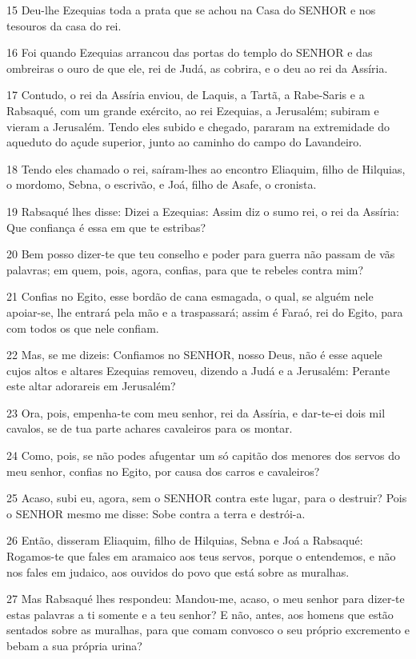 \par 15 Deu-lhe Ezequias toda a prata que se achou na Casa do SENHOR e nos tesouros da casa do rei.
\par 16 Foi quando Ezequias arrancou das portas do templo do SENHOR e das ombreiras o ouro de que ele, rei de Judá, as cobrira, e o deu ao rei da Assíria.
\par 17 Contudo, o rei da Assíria enviou, de Laquis, a Tartã, a Rabe-Saris e a Rabsaqué, com um grande exército, ao rei Ezequias, a Jerusalém; subiram e vieram a Jerusalém. Tendo eles subido e chegado, pararam na extremidade do aqueduto do açude superior, junto ao caminho do campo do Lavandeiro.
\par 18 Tendo eles chamado o rei, saíram-lhes ao encontro Eliaquim, filho de Hilquias, o mordomo, Sebna, o escrivão, e Joá, filho de Asafe, o cronista.
\par 19 Rabsaqué lhes disse: Dizei a Ezequias: Assim diz o sumo rei, o rei da Assíria: Que confiança é essa em que te estribas?
\par 20 Bem posso dizer-te que teu conselho e poder para guerra não passam de vãs palavras; em quem, pois, agora, confias, para que te rebeles contra mim?
\par 21 Confias no Egito, esse bordão de cana esmagada, o qual, se alguém nele apoiar-se, lhe entrará pela mão e a traspassará; assim é Faraó, rei do Egito, para com todos os que nele confiam.
\par 22 Mas, se me dizeis: Confiamos no SENHOR, nosso Deus, não é esse aquele cujos altos e altares Ezequias removeu, dizendo a Judá e a Jerusalém: Perante este altar adorareis em Jerusalém?
\par 23 Ora, pois, empenha-te com meu senhor, rei da Assíria, e dar-te-ei dois mil cavalos, se de tua parte achares cavaleiros para os montar.
\par 24 Como, pois, se não podes afugentar um só capitão dos menores dos servos do meu senhor, confias no Egito, por causa dos carros e cavaleiros?
\par 25 Acaso, subi eu, agora, sem o SENHOR contra este lugar, para o destruir? Pois o SENHOR mesmo me disse: Sobe contra a terra e destrói-a.
\par 26 Então, disseram Eliaquim, filho de Hilquias, Sebna e Joá a Rabsaqué: Rogamos-te que fales em aramaico aos teus servos, porque o entendemos, e não nos fales em judaico, aos ouvidos do povo que está sobre as muralhas.
\par 27 Mas Rabsaqué lhes respondeu: Mandou-me, acaso, o meu senhor para dizer-te estas palavras a ti somente e a teu senhor? E não, antes, aos homens que estão sentados sobre as muralhas, para que comam convosco o seu próprio excremento e bebam a sua própria urina?
